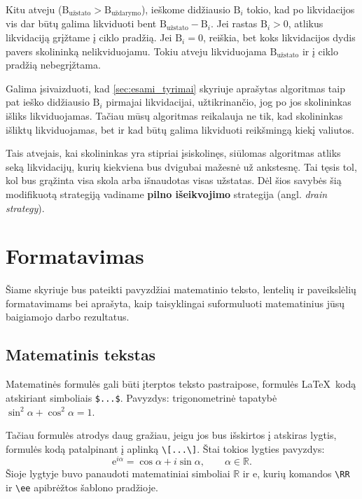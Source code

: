 \documentclass[]{VUMIFTemplateClass}
\newcommand{\ee}{{\mathrm e}}  %
\newcommand{\RR}{\mathbb{R}}
\begin{document}
Kitu atveju ($\text{B}_{\text{užstato}} > \text{B}_{\text{uždarymo}}$), ieškome didžiausio $\text{B}_{i}$ tokio, kad po likvidacijos vis dar būtų galima likviduoti bent $\text{B}_{\text{užstato}} - \text{B}_{i}$. Jei rastas $\text{B}_{i} > 0$, atlikus likvidaciją grįžtame į ciklo pradžią. Jei $\text{B}_{i} = 0$, reiškia, bet koks likvidacijos dydis pavers skolininką nelikviduojamu. Tokiu atveju likviduojama $\text{B}_{\text{užstato}}$ ir į ciklo pradžią nebegrįžtama.

Galima įsivaizduoti, kad \ref{sec:esami_tyrimai} skyriuje aprašytas algoritmas taip pat ieško didžiausio $\text{B}_{i}$ pirmajai likvidacijai, užtikrinančio, jog po jos skolininkas išliks likviduojamas. Tačiau mūsų algoritmas reikalauja ne tik, kad skolininkas išliktų likviduojamas, bet ir kad būtų galima likviduoti reikšmingą kiekį valiutos.

Tais atvejais, kai skolininkas yra stipriai įsiskolinęs, siūlomas algoritmas atliks seką likvidacijų, kurių kiekviena bus dvigubai mažesnė už ankstesnę. Tai tęsis tol, kol bus grąžinta visa skola arba išnaudotas visas užstatas. Dėl šios savybės šią modifikuotą strategiją vadiname \textbf{pilno išeikvojimo} strategija (angl. \textit{drain strategy}).

\section{Formatavimas}

Šiame skyriuje bus pateikti pavyzdžiai matematinio teksto, lentelių ir paveikslėlių formatavimams bei aprašyta, kaip taisyklingai suformuluoti matematinius jūsų baigiamojo darbo rezultatus.

\subsection{Matematinis tekstas}

Matematinės formulės gali būti įterptos teksto pastraipose, formulės \LaTeX~kodą atskiriant simboliais \texttt{\$...\$}. Pavyzdys: trigonometrinė tapatybė $\sin^2 \alpha + \cos^2 \alpha = 1$.

Tačiau formulės atrodys daug gražiau, jeigu jos bus išskirtos į atskiras lygtis, formulės kodą patalpinant į aplinką \texttt{\textbackslash[...\textbackslash]}. Štai tokios lygties pavyzdys:
\[
\ee^{i \alpha} = \cos{\alpha} + i \sin{\alpha}, \qquad \alpha \in \RR.
\]
Šioje lygtyje buvo panaudoti matematiniai simboliai $\RR$ ir $\ee$, kurių komandos \texttt{\textbackslash RR} ir \texttt{\textbackslash ee} apibrėžtos šablono pradžioje.
\end{document}
